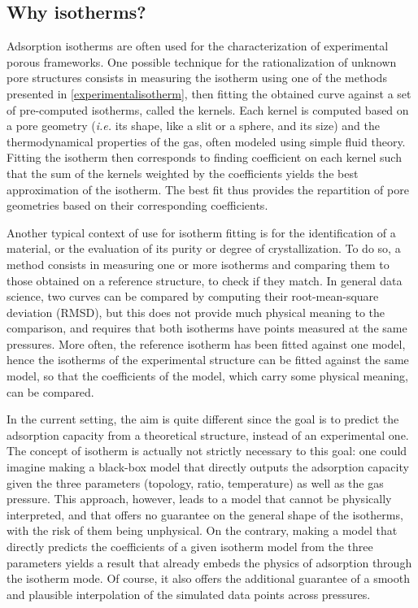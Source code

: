 \documentclass[main.tex]{subfiles}
\begin{document}
\subsection{Why isotherms?}

Adsorption isotherms are often used for the characterization of experimental porous frameworks. One possible technique for the rationalization of unknown pore structures consists in measuring the isotherm using one of the methods presented in \cref{experimentalisotherm}, then fitting the obtained curve against a set of pre-computed isotherms, called the kernels. Each kernel is computed based on a pore geometry (\textit{i.e.} its shape, like a slit or a sphere, and its size) and the thermodynamical properties of the gas, often modeled using simple fluid theory. Fitting the isotherm then corresponds to finding coefficient on each kernel such that the sum of the kernels weighted by the coefficients yields the best approximation of the isotherm. The best fit thus provides the repartition of pore geometries based on their corresponding coefficients.

Another typical context of use for isotherm fitting is for the identification of a material, or the evaluation of its purity or degree of crystallization. To do so, a method consists in measuring one or more isotherms and comparing them to those obtained on a reference structure, to check if they match. In general data science, two curves can be compared by computing their root-mean-square deviation (RMSD), but this does not provide much physical meaning to the comparison, and requires that both isotherms have points measured at the same pressures. More often, the reference isotherm has been fitted against one model, hence the isotherms of the experimental structure can be fitted against the same model, so that the coefficients of the model, which carry some physical meaning, can be compared.

In the current setting, the aim is quite different since the goal is to predict the adsorption capacity from a theoretical structure, instead of an experimental one. The concept of isotherm is actually not strictly necessary to this goal: one could imagine making a black-box model that directly outputs the adsorption capacity given the three parameters (topology, \SiAl ratio, temperature) as well as the gas pressure. This approach, however, leads to a model that cannot be physically interpreted, and that offers no guarantee on the general shape of the isotherms, with the risk of them being unphysical. On the contrary, making a model that directly predicts the coefficients of a given isotherm model from the three parameters yields a result that already embeds the physics of adsorption through the isotherm mode. Of course, it also offers the additional guarantee of a smooth and plausible interpolation of the simulated data points across pressures.
\end{document}
